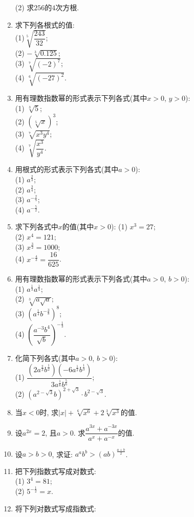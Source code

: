 \documentclass[10pt,a4paper]{article}
\begin{document}
\begin{enumerate}[1.]
(2) 求$256$的$4$次方根.
\item 求下列各根式的值:\\
(1)$\sqrt[5]{\dfrac{243}{32}}$;\\
(2) $-\sqrt[3]{0.125}$;\\
(3) $\sqrt[7]{(-2)^7}$;\\
(4) $\sqrt[6]{(-27)^2}$.
\item 用有理数指数幂的形式表示下列各式(其中$x>0$, $y>0$):\\
(1) $\sqrt[3]{5}$;\\
(2) $(\sqrt[5]{x})^3$;\\
(3) $\sqrt[7]{x^3y^4}$;\\
(4) $\sqrt[7]{\dfrac{x^3}{y^4}}$.
\item 用根式的形式表示下列各式(其中$a>0$):\\
(1) $a^\frac 23$;\\
(2) $a^\frac 34$;\\
(3) $a^{-\frac 25}$;\\
(4) $a^{-\frac 52}$.
\item 求下列各式中$x$的值(其中$x>0$):
(1) $x^3=27$;\\
(2) $x^4=121$;\\
(3) $x^\frac 32=1000$;\\
(4) $x^{-\frac 43}=\dfrac{16}{625}$.
\item 用有理数指数幂的形式表示下列各式(其中$a>0$, $b>0$):\\
(1) $a^\frac 13a^\frac 14$;\\
(2) $\sqrt[3]{a\sqrt a}$;\\
(3) $(a^\frac 14b^{-\frac 38})^8$;\\
(4) $(\dfrac {a^{-3}b^4}{\sqrt b})^{-\frac 13}$.
\item 化简下列各式(其中$a>0$, $b>0$):\\
(1) $\dfrac{(2a^\frac 23b^\frac 12)(-6a^\frac 12b^\frac 13)}{3a^\frac 16b^\frac 56}$;\\
(2) $(a^{2-\sqrt 3}b)^{2+\sqrt 3}\cdot b^{2-\sqrt 3}$.
\item 当$x<0$时, 求$|x|+\sqrt[6]{x^6}+2\sqrt[3]{x^3}$的值.
\item 设$a^{2x}=2$, 且$a>0$. 求$\dfrac{a^{3x}+a^{-3x}}{a^x+a^{-x}}$的值.
\item 设$a>b>0$, 求证: $a^ab^b>(ab)^\frac{a+b}2$. 
\item 把下列指数式写成对数式:\\
(1) $3^4=81$;\\
(2) $5^{-\frac1 2}=x$.
\item 将下列对数式写成指数式:\\

\end{enumerate}
\end{document}
